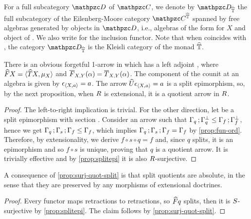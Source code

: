 For a full subcategory $\D$ of $\CC$, we denote by $\D_{\fn{\mnd}}$ the full subcategory of the Eilenberg-Moore category $\CC^{\fn\mnd}$ spanned by free algebras generated by objects in $\D$, i.e., algebras of the form  for $X$ and object of \D. 
We also write  for the inclusion functor.
Note that when \D coincides with \CC, the category $\D_{\fn\mnd}$ is the Kleisli category of the monad $\widehat{\mathbb{T}}$. 

There is an obvious forgetful 1-arrow  in \RDtn which has a left  adjoint , where $\widehat{F}X = {\langle \widehat{T}X,\mu_X \rangle }$ and $\overline{F}_{X,Y}(\alpha) = \overline{T}_{X,Y}(\alpha)$. 
The component of the counit at an algebra  is  given by $\epsilon_{{\langle X,a \rangle }} = a$. 
The arrow $\widehat{U}\epsilon_{{\langle X,a \rangle }} = a$ is a split epimorphism, so, by the next proposition, when $R$ is extensional, it is a quotient arrow in $R$. 

\begin{proof}
The left-to-right implication is trivial. 
For the other direction, let  be a split epimorphism with section . 
Consider an arrow  such that $\Gamma_{q}\mathop{\mathbf{;}}\Gamma_{q}^{\bot} \leq \Gamma_{f}\mathop{\mathbf{;}}\Gamma_{f}^{\bot}$, hence we get 
$\Gamma_{q}\mathop{\mathbf{;}}\Gamma_{s}\mathop{\mathbf{;}}\Gamma_{f} \leq \Gamma_{f}$, which implies $\Gamma_{q}\mathop{\mathbf{;}}\Gamma_{s}\mathop{\mathbf{;}}\Gamma_{f} = \Gamma_{f}$ by \cref{prop:fun-ord}. 
Therefore, by extensionality, we derive $f\circ s \circ q = f$ and, since $q$ splits,  it is an epimorphism and so $f\circ s$ is unique, proving that $q$ is a quotient arrow. It is trivially effective and  by \cref{prop:splitepi}  it is also $R$-surjective.
% 
\end{proof} 

A consequence of \cref{prop:surj-quot-split} is that split quotients are absolute, in the sense that they are preserved by any morphisms of extensional doctrines.

\begin{proof}
Every functor maps retractions to retractions, so $\widehat{F}q$ splits, then it is $S$-surjective by \cref{prop:splitepi}. The claim follows by \cref{prop:surj-quot-split}.
\end{proof} 




